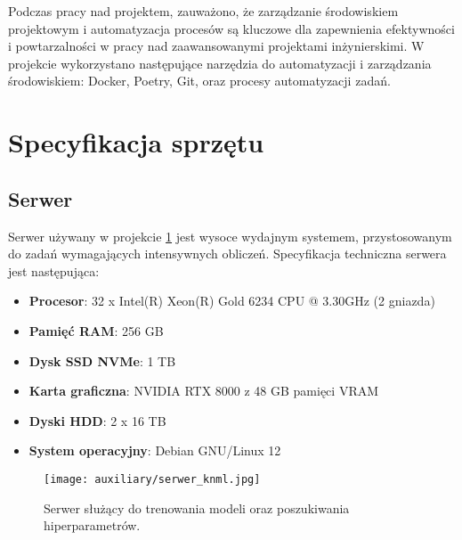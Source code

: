 \documentclass[12pt,twoside]{article}
\begin{document}
    Podczas pracy nad projektem, zauważono, że zarządzanie środowiskiem projektowym i automatyzacja procesów są kluczowe
    dla zapewnienia efektywności i powtarzalności w pracy nad zaawansowanymi projektami inżynierskimi. W projekcie
    wykorzystano następujące narzędzia do automatyzacji i zarządzania środowiskiem: Docker, Poetry, Git, oraz procesy
    automatyzacji zadań.


    \section{Specyfikacja sprzętu}

    \subsection{Serwer}
    Serwer używany w projekcie \ref{fig:serwer_knml}
    jest wysoce wydajnym systemem, przystosowanym do zadań wymagających intensywnych obliczeń. Specyfikacja techniczna
    serwera jest następująca:
    \begin{itemize}
        \item \textbf{Procesor}: 32 x Intel(R) Xeon(R) Gold 6234 CPU @ 3.30GHz (2 gniazda)
        \item \textbf{Pamięć RAM}: 256 GB
        \item \textbf{Dysk SSD NVMe}: 1 TB
        \item \textbf{Karta graficzna}: NVIDIA RTX 8000 z 48 GB pamięci VRAM
        \item \textbf{Dyski HDD}: 2 x 16 TB
        \item \textbf{System operacyjny}: Debian GNU/Linux 12
    \end{itemize}

    \begin{figure}[ht]
        \centering
        \texttt{[image: auxiliary/serwer\_knml.jpg]}
        \caption{Serwer służący do trenowania modeli oraz poszukiwania hiperparametrów.}
        \label{fig:serwer_knml}
    \end{figure}
\end{document}
